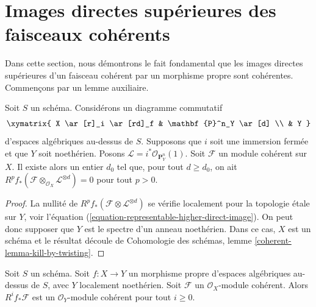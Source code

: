 \section{Images directes supérieures des faisceaux cohérents}
\label{section-proper-pushforward}

\noindent
Dans cette section, nous démontrons le fait fondamental que les images
directes supérieures d'un faisceau cohérent par un morphisme propre
sont cohérentes. Commençons par un lemme auxiliaire.

\begin{lemma}
\label{lemma-kill-by-twisting}
Soit $S$ un schéma. Considérons un diagramme commutatif
$$
\xymatrix{
X \ar[r]_i \ar[rd]_f & \mathbf{P}^n_Y \ar[d] \\
& Y
}
$$
d'espaces algébriques au-dessus de $S$. Supposons que $i$ soit une immersion fermée
et que $Y$ soit noethérien. Posons $\mathcal{L} = i^*\mathcal{O}_{\mathbf{P}^n_Y}(1)$.
Soit $\mathcal{F}$ un module cohérent sur $X$.
Il existe alors un entier $d_0$ tel que, pour tout $d \geq d_0$, on ait
$R^pf_*(\mathcal{F} \otimes_{\mathcal{O}_X} \mathcal{L}^{\otimes d}) = 0$
pour tout $p > 0$.
\end{lemma}

\begin{proof}
La nullité de $R^pf_*(\mathcal{F} \otimes \mathcal{L}^{\otimes d})$
se vérifie localement pour la topologie \'etale sur $Y$, voir
l'équation (\ref{equation-representable-higher-direct-image}).
On peut donc supposer que $Y$ est le spectre d'un anneau noethérien. Dans ce cas,
$X$ est un schéma et le résultat découle de
Cohomologie des schémas, lemme \ref{coherent-lemma-kill-by-twisting}.
\end{proof}

\begin{lemma}
\label{lemma-proper-pushforward-coherent}
Soit $S$ un schéma. Soit $f : X \to Y$ un morphisme propre
d'espaces algébriques au-dessus de $S$, avec $Y$ localement noethérien.
Soit $\mathcal{F}$ un $\mathcal{O}_X$-module cohérent.
Alors $R^if_*\mathcal{F}$ est un $\mathcal{O}_Y$-module cohérent
pour tout $i \geq 0$.
\end{lemma}

